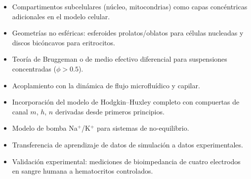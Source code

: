\documentclass[12pt]{article}
\begin{document}
\begin{itemize}
\item Compartimentos subcelulares (n\'ucleo, mitocondrias) como capas conc\'entricas
adicionales en el modelo celular.
\item Geometr\'ias no esf\'ericas: esferoides prolatos/oblatos para c\'elulas nucleadas y
discos bic\'oncavos para eritrocitos.

\item Teor\'ia de Bruggeman o de medio efectivo diferencial para suspensiones
concentradas ($\phi > 0.5$).
\item Acoplamiento con la din\'amica de flujo microflu\'idico y capilar.
\item Incorporaci\'on del modelo de Hodgkin--Huxley completo con compuertas de canal
$m$, $h$, $n$ derivadas desde primeros principios.
\item Modelo de bomba Na$^+$/K$^+$ para sistemas de no-equilibrio.
\item Transferencia de aprendizaje de datos de simulaci\'on a datos experimentales.
\item Validaci\'on experimental: mediciones de bioimpedancia de cuatro electrodos en
sangre humana a hematocritos controlados.
\end{itemize}
\end{document}
